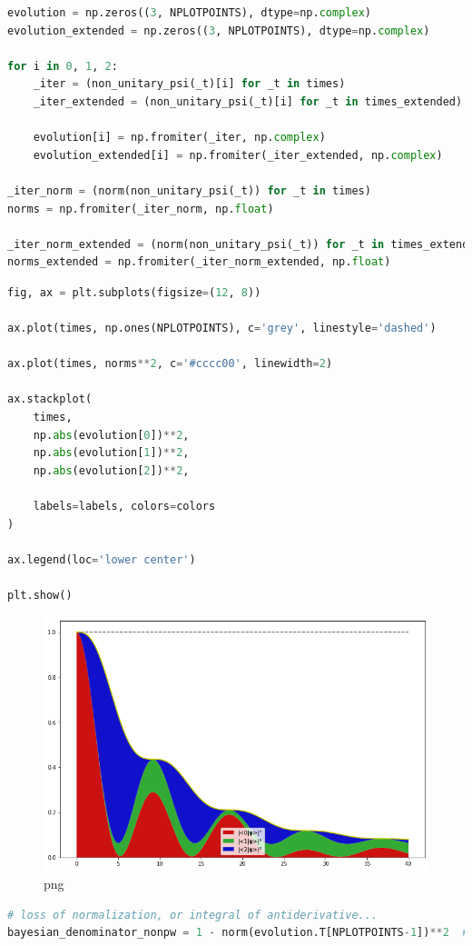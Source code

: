 \begin{lstlisting}[language=Python]
evolution = np.zeros((3, NPLOTPOINTS), dtype=np.complex)
evolution_extended = np.zeros((3, NPLOTPOINTS), dtype=np.complex)

for i in 0, 1, 2:
    _iter = (non_unitary_psi(_t)[i] for _t in times)
    _iter_extended = (non_unitary_psi(_t)[i] for _t in times_extended)

    evolution[i] = np.fromiter(_iter, np.complex)
    evolution_extended[i] = np.fromiter(_iter_extended, np.complex)

_iter_norm = (norm(non_unitary_psi(_t)) for _t in times)
norms = np.fromiter(_iter_norm, np.float)

_iter_norm_extended = (norm(non_unitary_psi(_t)) for _t in times_extended)
norms_extended = np.fromiter(_iter_norm_extended, np.float)
\end{lstlisting}

\begin{lstlisting}[language=Python]
fig, ax = plt.subplots(figsize=(12, 8))

ax.plot(times, np.ones(NPLOTPOINTS), c='grey', linestyle='dashed')

ax.plot(times, norms**2, c='#cccc00', linewidth=2)

ax.stackplot(
    times,
    np.abs(evolution[0])**2,
    np.abs(evolution[1])**2,
    np.abs(evolution[2])**2,
    
    labels=labels, colors=colors
)

ax.legend(loc='lower center')

plt.show()
\end{lstlisting}

\begin{figure}
\centering
\includegraphics[width=0.666\linewidth]{tex/appendix/nb/jupyter/3lev/output_34_0.png}
\caption{png}
\end{figure}

\begin{lstlisting}[language=Python]
# loss of normalization, or integral of antiderivative...
bayesian_denominator_nonpw = 1 - norm(evolution.T[NPLOTPOINTS-1])**2  # TODO! explain/replace
\end{lstlisting}

